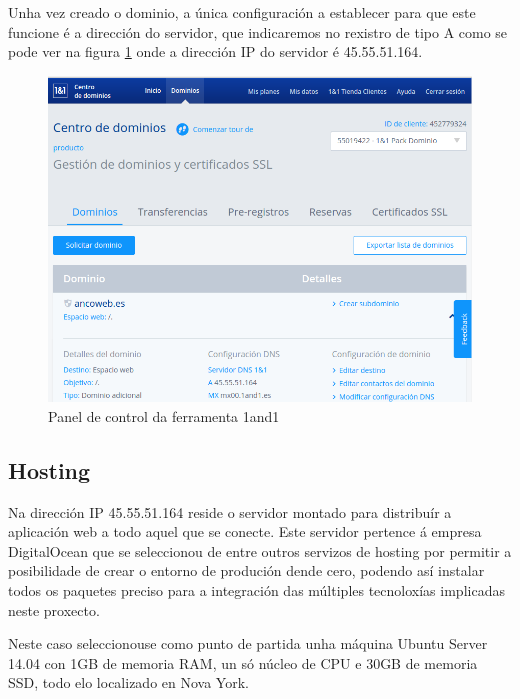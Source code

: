         Unha vez creado o dominio, a única configuración a establecer para que este funcione 
        é a dirección do servidor, que indicaremos no rexistro de tipo A como se pode
        ver na figura \ref{fig:1and1Capture} onde a dirección IP do servidor é 45.55.51.164.

        \begin{figure}[htp]
        \begin{center}
            \includegraphics[scale=0.5]{figures/1and1Capture.png}
            \caption{Panel de control da ferramenta 1and1}
        \label{fig:1and1Capture}
        \end{center}
        \end{figure}
    
    \subsection{Hosting}
        Na dirección IP 45.55.51.164 reside o servidor montado para distribuír a aplicación web a 
        todo aquel que se conecte. Este servidor pertence á empresa DigitalOcean
        \cite{digitalocean-website} que se seleccionou de entre outros servizos de hosting por 
        permitir a posibilidade de crear o entorno de produción dende cero, podendo así instalar 
        todos os paquetes preciso para a integración das múltiples tecnoloxías implicadas neste 
        proxecto.
        
        Neste caso seleccionouse como punto de partida unha máquina Ubuntu Server 14.04 con 1GB de 
        memoria RAM, un só núcleo de CPU e 30GB de memoria SSD, todo elo localizado en Nova York.
    
